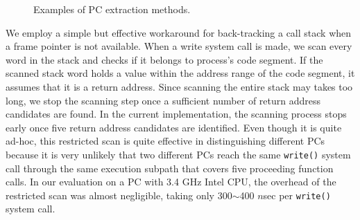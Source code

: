 \begin{figure}[t]
	\centering
	\hspace{10pt}
	\vspace{-9pt}
	\caption{Examples of PC extraction methods.}
	\label{fig:getpc}
	\vspace{-15pt}
\end{figure}

We employ a simple but effective workaround for back-tracking a call stack when
a frame pointer is not available.  When a write system call is made,
we scan every word in the stack
and checks if it belongs to process's code segment.  If the scanned stack word
holds a value within the address range of the code segment, it assumes that it
is a return address.  Since scanning the entire stack may takes too long, we stop
the scanning step once a sufficient number of return address candidates are found.
In the current implementation, the scanning process stops early once 
five return address candidates are identified.  
Even though it is quite ad-hoc, this restricted scan is quite effective
in distinguishing different PCs because it is very unlikely that two different PCs
reach the same \texttt{write()} system call through the same execution subpath 
that covers five proceeding function calls. 
In our evaluation on a PC with 3.4 GHz Intel CPU, the overhead of the
restricted scan was almost negligible, taking only 300$\sim$400 $n$sec per
\texttt{write()} system call.

